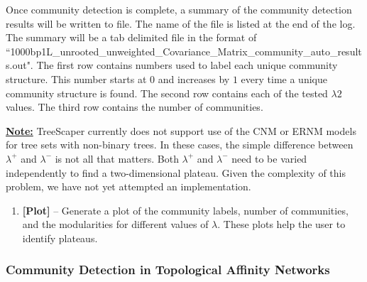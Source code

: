 \documentclass[11pt]{article}
\begin{document}
\begin{sloppypar}Once community detection is complete, a summary of the community detection
results will be written to file. The name of the file is listed at the end of the log. The
summary will be a tab delimited file in the format of ``1000bp1L\_unrooted\_unweighted\_Covariance\_Matrix\_community\_auto\_results.out".  The first row contains numbers used to label each unique community structure. This number
starts at $0$ and increases by $1$ every time a unique community structure is found. The second
row contains each of the tested $\lambda2$ values. The third row contains the number of
communities. \\ \end{sloppypar}


\noindent\ul{\bf Note:} TreeScaper currently does not support use of the CNM or ERNM models for tree sets with non-binary trees. In these cases, the simple difference between $\lambda^{+}$ and $\lambda^{-}$ is not all that matters. Both $\lambda^{+}$ and $\lambda^{-}$ need to be varied independently to find a two-dimensional plateau. Given the complexity of this problem, we have not yet attempted an implementation. \\


\begin{enumerate}[{\bf 8-}]
\item {\bf [Plot]} -- Generate a plot of the community labels, number of communities, and the
modularities for different values of $\lambda$. These plots help the user to identify plateaus. \\
\end{enumerate}


\newpage
\subsubsection{Community Detection in Topological Affinity Networks}\label{subsubsect:CommunityDetectionTopologicalAffinityMenu}
\end{document}
